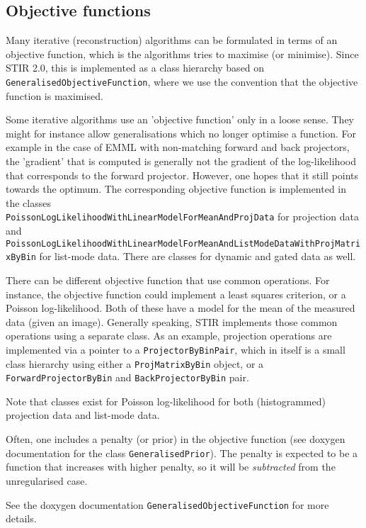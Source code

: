 \documentclass{article}
\begin{document}
\subsection{Objective functions}
Many iterative (reconstruction) algorithms can be formulated in terms
of an objective function, which is the algorithms tries to 
maximise (or minimise). Since STIR 2.0, this is implemented
as a class hierarchy based on \texttt{GeneralisedObjectiveFunction},
where we use the convention that the objective function is maximised. 

Some iterative algorithms use an 'objective function' only in a 
loose sense. They might for instance allow generalisations 
which no longer optimise a function. For example in the case
of EMML with non-matching forward and back projectors, the 'gradient' 
that is computed is generally not the gradient of the
log-likelihood that corresponds to the forward projector.
However, one hopes that it still points towards the optimum.
The corresponding objective function is implemented in the classes\\
\texttt{PoissonLogLikelihoodWithLinearModelForMeanAndProjData} for
projection data and \texttt{PoissonLogLikelihoodWithLinearModelForMeanAndListModeDataWithProjMatrixByBin}
for list-mode data. There are classes for dynamic and gated data as well.

There can be different objective function that use common operations.
For instance, the objective function could implement a least squares
criterion, or a Poisson log-likelihood. Both of these have a model
for the mean of the measured data (given an image). Generally speaking,
STIR implements those common operations using a separate class.
As an example, projection operations are implemented via a pointer to a 
\texttt{ProjectorByBinPair}, which in itself is a small
class hierarchy using either a \texttt{ProjMatrixByBin} object, 
or a \texttt{ForwardProjectorByBin} and \texttt{BackProjectorByBin} pair.

Note that classes exist for Poisson log-likelihood for both (histogrammed)
projection data and list-mode data.

Often, one includes a penalty (or prior) in the objective function
(see doxygen documentation for the class \texttt{GeneralisedPrior}).
The penalty is expected to be a function that increases with higher 
penalty, so it will be \textit{subtracted}
from the unregularised case.

See the doxygen documentation \texttt{GeneralisedObjectiveFunction} for
more details.
\end{document}
